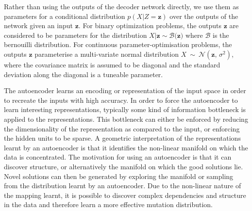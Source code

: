 \documentclass[twoside]{article}
\begin{document}
Rather than using the outputs of the decoder network directly, we use them as parameters for a conditional distribution $p(X|Z=\mathbf{z})$ over the outputs of the network given an input $\mathbf{z}$. For binary optimization problems, the outputs $\mathbf{z}$ are considered to be parameters for the distribution $X|\mathbf{z} \sim \mathcal{B(\mathbf{z}})$ where $\mathcal{B}$ is the bernouilli distribution. For continuous parameter-optimisation problems, the outputs $\mathbf z$ parameterise a multi-variate normal distribution $X\ \sim\ \mathcal{N}(\mathbf{z},\,\sigma^2)$, where the covariance matrix is assumed to be diagonal and the standard deviation along the diagonal is a tuneable parameter.

The autoencoder learns an encoding or representation of the input space in order to recreate the inputs with high accuracy. In order to force the autoencoder to learn interesting representations, typically some kind of information bottleneck is applied to the representations. This bottleneck can either be enforced by reducing the dimensionality of the representation as compared to the input, or enforcing the hidden units to be sparse. A geometric interpretation of the representations learnt by an autoencoder is that it identifies the non-linear manifold on which the data is concentrated. The motivation for using an autoencoder is that it can discover structure, or alternatively the manifold on which the good solutions lie. Novel solutions can then be generated by exploring the manifold or sampling from the distribution learnt by an autoencoder. Due to the non-linear nature of the mapping learnt, it is possible to discover complex dependencies and structure in the data and therefore learn a more effective mutation distribution. 



\end{document}

